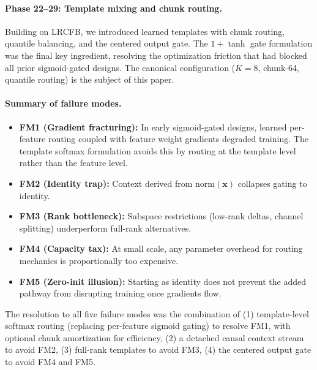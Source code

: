 \documentclass{article}
\begin{document}
\paragraph{Phase 22--29: Template mixing and chunk routing.}
Building on LRCFB, we introduced learned templates with chunk routing, quantile balancing, and the centered output gate. The $1 + \tanh$ gate formulation was the final key ingredient, resolving the optimization friction that had blocked all prior sigmoid-gated designs. The canonical configuration ($K{=}8$, chunk-64, quantile routing) is the subject of this paper.

\paragraph{Summary of failure modes.}
\begin{itemize}
\item \textbf{FM1 (Gradient fracturing):} In early sigmoid-gated designs, learned per-feature routing coupled with feature weight gradients degraded training. The template softmax formulation avoids this by routing at the template level rather than the feature level.
\item \textbf{FM2 (Identity trap):} Context derived from $\text{norm}(\mathbf{x})$ collapses gating to identity.
\item \textbf{FM3 (Rank bottleneck):} Subspace restrictions (low-rank deltas, channel splitting) underperform full-rank alternatives.
\item \textbf{FM4 (Capacity tax):} At small scale, any parameter overhead for routing mechanics is proportionally too expensive.
\item \textbf{FM5 (Zero-init illusion):} Starting as identity does not prevent the added pathway from disrupting training once gradients flow.
\end{itemize}

The resolution to all five failure modes was the combination of (1) template-level softmax routing (replacing per-feature sigmoid gating) to resolve FM1, with optional chunk amortization for efficiency, (2) a detached causal context stream to avoid FM2, (3) full-rank templates to avoid FM3, (4) the centered output gate to avoid FM4 and FM5.

\newpage

\end{document}

